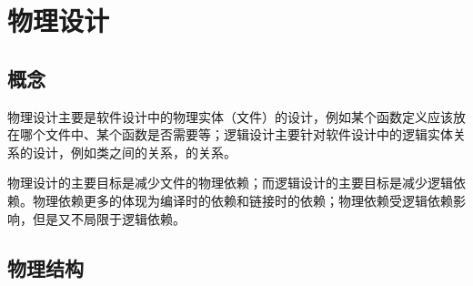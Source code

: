 \begin{savequote}[45mm]
\end{savequote}

\chapter{物理设计} 
\label{ch:physical-design}

\section{概念}

\begin{content}

物理设计主要是软件设计中的物理实体（文件）的设计，例如某个函数定义应该放在哪个文件中、某个函数是否需要等；逻辑设计主要针对软件设计中的逻辑实体关系的设计，例如类之间的关系，的关系。

物理设计的主要目标是减少文件的物理依赖；而逻辑设计的主要目标是减少逻辑依赖。物理依赖更多的体现为编译时的依赖和链接时的依赖；物理依赖受逻辑依赖影响，但是又不局限于逻辑依赖。

\end{content}

\section{物理结构}

